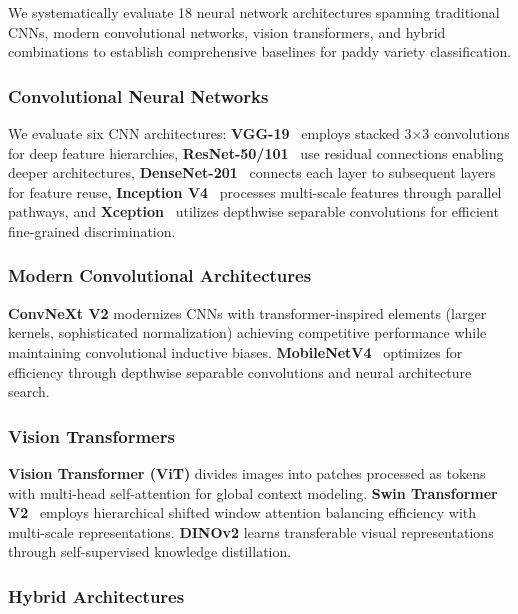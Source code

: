 \documentclass[conference]{IEEEtran}
\begin{document}
We systematically evaluate 18 neural network architectures spanning traditional CNNs, modern convolutional networks, vision transformers, and hybrid combinations to establish comprehensive baselines for paddy variety classification.

\subsubsection{Convolutional Neural Networks}

We evaluate six CNN architectures: \textbf{VGG-19}~\cite{vgg-19} employs stacked 3×3 convolutions for deep feature hierarchies, \textbf{ResNet-50/101}~\cite{resnet} use residual connections enabling deeper architectures, \textbf{DenseNet-201}~\cite{densenet-201} connects each layer to subsequent layers for feature reuse, \textbf{Inception V4}~\cite{inception-v4} processes multi-scale features through parallel pathways, and \textbf{Xception}~\cite{xception} utilizes depthwise separable convolutions for efficient fine-grained discrimination.

\subsubsection{Modern Convolutional Architectures}

\textbf{ConvNeXt V2} modernizes CNNs with transformer-inspired elements (larger kernels, sophisticated normalization) achieving competitive performance while maintaining convolutional inductive biases. \textbf{MobileNetV4}~\cite{mobilenet} optimizes for efficiency through depthwise separable convolutions and neural architecture search.

\subsubsection{Vision Transformers}

\textbf{Vision Transformer (ViT)} divides images into patches processed as tokens with multi-head self-attention for global context modeling. \textbf{Swin Transformer V2}~\cite{swin} employs hierarchical shifted window attention balancing efficiency with multi-scale representations. \textbf{DINOv2} learns transferable visual representations through self-supervised knowledge distillation.

\subsubsection{Hybrid Architectures}
\end{document}
